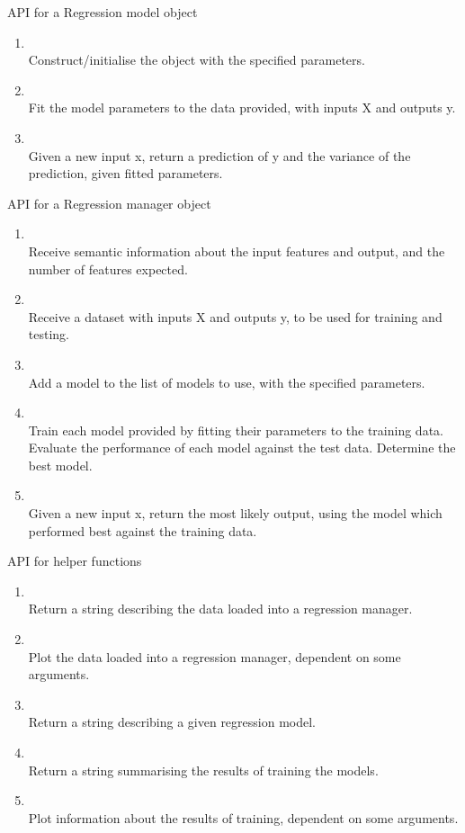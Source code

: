 \documentclass[../../main.tex]{subfiles}
\begin{document}
API for a Regression model object
\begin{enumerate}
    \item {} \\
        Construct/initialise the object with the specified parameters.
    \item {} \\
        Fit the model parameters to the data provided, with inputs X and outputs y.
    \item {} \\
        Given a new input x, return a prediction of y and the variance of the prediction, given fitted parameters.
\end{enumerate}

API for a Regression manager object
\begin{enumerate}
    \item {} \\
        Receive semantic information about the input features and output, and the number of features expected.
    \item {} \\
        Receive a dataset with inputs X and outputs y, to be used for training and testing.
    \item {} \\
        Add a model to the list of models to use, with the specified parameters.
    \item {} \\
        Train each model provided by fitting their parameters to the training data. Evaluate the performance of each model against the test data. Determine the best model.
    \item {} \\
        Given a new input x, return the most likely output, using the model which performed best against the training data.
\end{enumerate}

API for helper functions
\begin{enumerate}
    \item {} \\
        Return a string describing the data loaded into a regression manager.
    \item {} \\
        Plot the data loaded into a regression manager, dependent on some arguments.
    \item {} \\
        Return a string describing a given regression model.
    \item {} \\
        Return a string summarising the results of training the models.
    \item {} \\
        Plot information about the results of training, dependent on some arguments.
\end{enumerate}
\end{document}

